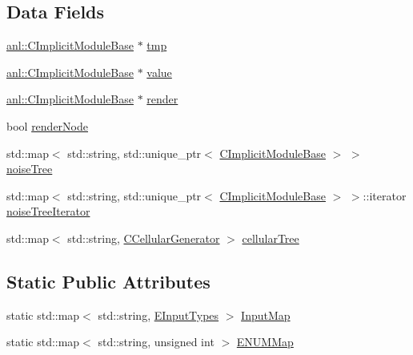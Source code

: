 \subsection*{Data Fields}
\begin{DoxyCompactItemize}
\item 
\hyperlink{classanl_1_1CImplicitModuleBase}{anl::CImplicitModuleBase} $\ast$ \hyperlink{classanl_1_1CImplicitSequence_afafc9a1412d549d9ee0b11366e5c86b8}{tmp}
\item 
\hyperlink{classanl_1_1CImplicitModuleBase}{anl::CImplicitModuleBase} $\ast$ \hyperlink{classanl_1_1CImplicitSequence_a82194754c6382be31fe9130ae018115e}{value}
\item 
\hyperlink{classanl_1_1CImplicitModuleBase}{anl::CImplicitModuleBase} $\ast$ \hyperlink{classanl_1_1CImplicitSequence_aaa95687c46e84298674162e46511483e}{render}
\item 
bool \hyperlink{classanl_1_1CImplicitSequence_a58b84597820e57aefbc9f0ad5405136e}{renderNode}
\item 
std::map$<$ std::string, std::unique\_\-ptr$<$ \hyperlink{classanl_1_1CImplicitModuleBase}{CImplicitModuleBase} $>$ $>$ \hyperlink{classanl_1_1CImplicitSequence_acf719dd63bce5b8ca4a5b1c3fb477744}{noiseTree}
\item 
std::map$<$ std::string, std::unique\_\-ptr$<$ \hyperlink{classanl_1_1CImplicitModuleBase}{CImplicitModuleBase} $>$ $>$::iterator \hyperlink{classanl_1_1CImplicitSequence_a81841ff0a0a6ca069cd931e2f500dc92}{noiseTreeIterator}
\item 
std::map$<$ std::string, \hyperlink{classanl_1_1CCellularGenerator}{CCellularGenerator} $>$ \hyperlink{classanl_1_1CImplicitSequence_a3b8f7448c87195a5afe6a19fe8845817}{cellularTree}
\end{DoxyCompactItemize}
\subsection*{Static Public Attributes}
\begin{DoxyCompactItemize}
\item 
static std::map$<$ std::string, \hyperlink{namespaceanl_ac7c21af440d2d15319183300fa95d572}{EInputTypes} $>$ \hyperlink{classanl_1_1CImplicitSequence_a387855cd1e251196f98a3c683ebfa66f}{InputMap}
\item 
static std::map$<$ std::string, unsigned int $>$ \hyperlink{classanl_1_1CImplicitSequence_add19693d97dcac3984a0efd40fba1b69}{ENUMMap}
\end{DoxyCompactItemize}


